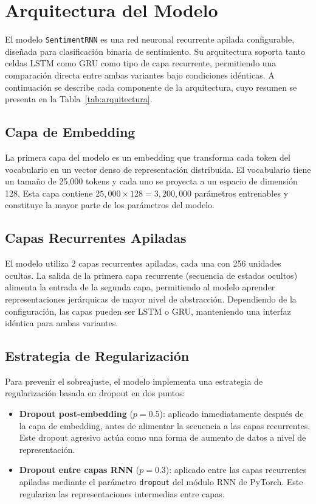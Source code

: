 \section{Arquitectura del Modelo}

El modelo \texttt{SentimentRNN} es una red neuronal recurrente apilada configurable,
diseñada para clasificación binaria de sentimiento. Su arquitectura soporta tanto
celdas LSTM como GRU como tipo de capa recurrente, permitiendo una comparación
directa entre ambas variantes bajo condiciones idénticas. A continuación se describe
cada componente de la arquitectura, cuyo resumen se presenta en la
Tabla~\ref{tab:arquitectura}.

\subsection{Capa de Embedding}

La primera capa del modelo es un embedding que transforma cada token del vocabulario
en un vector denso de representación distribuida. El vocabulario tiene un tamaño de
25,000 tokens y cada uno se proyecta a un espacio de dimensión 128. Esta capa
contiene $25{,}000 \times 128 = 3{,}200{,}000$ parámetros entrenables y constituye
la mayor parte de los parámetros del modelo.

\subsection{Capas Recurrentes Apiladas}

El modelo utiliza 2 capas recurrentes apiladas, cada una con 256 unidades ocultas.
La salida de la primera capa recurrente (secuencia de estados ocultos) alimenta
la entrada de la segunda capa, permitiendo al modelo aprender representaciones
jerárquicas de mayor nivel de abstracción. Dependiendo de la configuración, las
capas pueden ser LSTM o GRU, manteniendo una interfaz idéntica para ambas variantes.

\subsection{Estrategia de Regularización}

Para prevenir el sobreajuste, el modelo implementa una estrategia de regularización
basada en dropout en dos puntos:

\begin{itemize}
    \item \textbf{Dropout post-embedding} ($p = 0.5$): aplicado inmediatamente después
    de la capa de embedding, antes de alimentar la secuencia a las capas recurrentes.
    Este dropout agresivo actúa como una forma de aumento de datos a nivel de
    representación.
    \item \textbf{Dropout entre capas RNN} ($p = 0.3$): aplicado entre las capas
    recurrentes apiladas mediante el parámetro \texttt{dropout} del módulo RNN de
    PyTorch. Este regulariza las representaciones intermedias entre capas.
\end{itemize}

